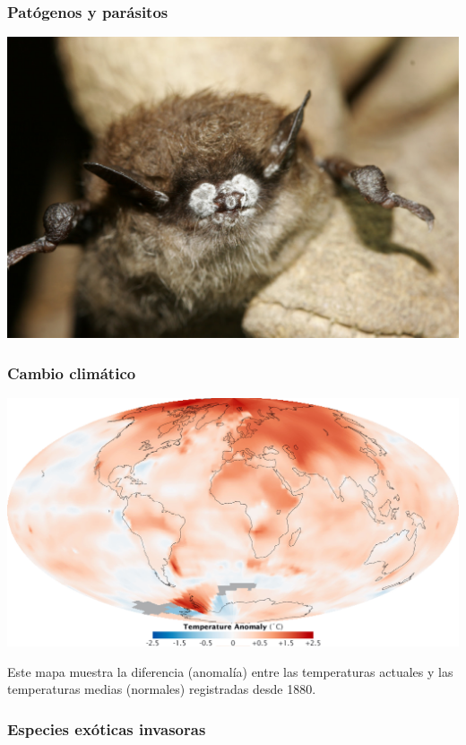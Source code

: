 \documentclass[
]{article}
\begin{document}
\hypertarget{patuxf3genos-y-paruxe1sitos}{%
\subsubsection{Patógenos y
parásitos}\label{patuxf3genos-y-paruxe1sitos}}

\includegraphics{figures/whitenose1.jpg}

\hypertarget{cambio-climuxe1tico}{%
\subsubsection{Cambio climático}\label{cambio-climuxe1tico}}

\includegraphics{figures/climatechange1.jpg}

Este mapa muestra la diferencia (anomalía) entre las temperaturas
actuales y las temperaturas medias (normales) registradas desde 1880.

\hypertarget{especies-exuxf3ticas-invasoras}{%
\subsubsection{Especies exóticas
invasoras}\label{especies-exuxf3ticas-invasoras}}
\end{document}
